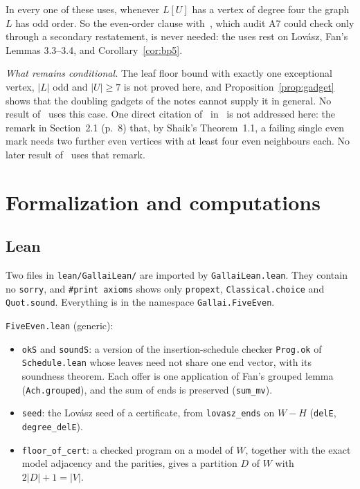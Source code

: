 \documentclass[11pt]{amsart}
\theoremstyle{definition}
\begin{document}
In every one of these uses, whenever $L[U]$ has a vertex of degree four the graph $L$ has odd order.
So the even-order clause with~\cite[Theorem~5]{FHZ}, which audit A7 could check only through a
secondary restatement, is never needed: the uses rest on Lov\'asz, Fan's Lemmas 3.3--3.4,
\cite[Theorem~13 and Corollary~14]{BS} and Corollary~\ref{cor:bp5}.

\emph{What remains conditional.} The leaf floor bound with exactly one exceptional vertex, $|L|$ odd
and $|U|\ge7$ is not proved here, and Proposition~\ref{prop:gadget} shows that the doubling
gadgets of the notes cannot supply it in general. No result of~\cite{MR} uses this case. One direct
citation of~\cite{Shaik} in~\cite{MR} is not addressed here: the remark in Section~2.1 (p.~8) that,
by Shaik's Theorem~1.1, a failing single even mark needs two further even vertices with at least four
even neighbours each. No later result of~\cite{MR} uses that remark.

\section{Formalization and computations}\label{sec:lean}

\subsection*{Lean}
Two files in \texttt{lean/GallaiLean/} are imported by \texttt{GallaiLean.lean}. They contain no
\texttt{sorry}, and \texttt{\#print axioms} shows only \texttt{propext}, \texttt{Classical.choice} and
\texttt{Quot.sound}. Everything is in the namespace \texttt{Gallai.FiveEven}.

\texttt{FiveEven.lean} (generic):
\begin{itemize}
\item \texttt{okS} and \texttt{soundS}: a version of the insertion-schedule checker \texttt{Prog.ok}
of \texttt{Schedule.lean} whose leaves need not share one end vector, with its soundness theorem.
Each offer is one application of Fan's grouped lemma (\texttt{Ach.grouped}), and the sum of ends is
preserved (\texttt{sum\_mv}).
\item \texttt{seed}: the Lov\'asz seed of a certificate, from \texttt{lovasz\_ends} on
$W-H$ (\texttt{delE}, \texttt{degree\_delE}).
\item \texttt{floor\_of\_cert}: a checked program on a model of $W$, together with the exact model
adjacency and the parities, gives a partition $D$ of $W$ with $2|D|+1=|V|$.
\end{itemize}
\end{document}
